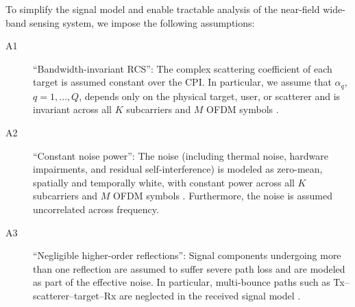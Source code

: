 \documentclass[9pt,final,journal,twocolumn]{IEEEtran}
\begin{document}
To simplify the signal model and enable tractable analysis of the near-field wide-band sensing system, we impose the following assumptions:
\begin{description}
\item[A1] ``Bandwidth-invariant RCS'': The complex scattering coefficient of each target is assumed constant over the CPI. In particular, we assume that $\alpha_q$, $q=1,\ldots,Q$, depends only on the physical target, user, or scatterer and is invariant across all $K$ subcarriers and $M$ OFDM symbols \cite{bao2019precoding,baquero2019full}.
\item[A2] ``Constant noise power'': The noise (including thermal noise, hardware impairments, and residual self-interference) is modeled as zero-mean, spatially and temporally white, with constant power across all $K$ subcarriers and $M$ OFDM symbols \cite{cheng2021hybrid}. Furthermore, the noise is assumed uncorrelated across frequency.  %
\item[A3] ``Negligible higher-order reflections'': Signal components undergoing more than one reflection are assumed to suffer severe path loss and are modeled as part of the effective noise. In particular, multi-bounce paths such as Tx–scatterer–target–Rx are neglected in the received signal model \cite{xu2023bandwidth}. 
\end{description}

\vspace{-0.2cm}
\end{document}
